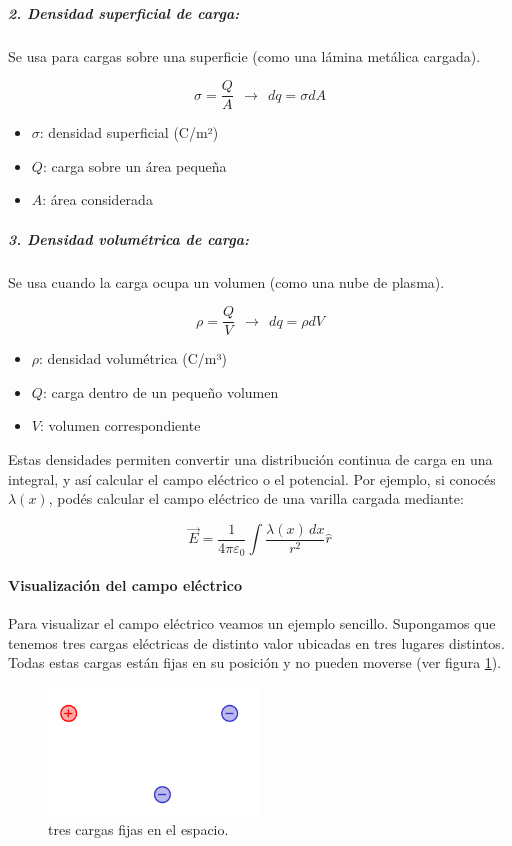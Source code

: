 \subparagraph{2. Densidad superficial de carga:}

Se usa para cargas sobre una superficie (como una lámina metálica cargada).

\[
\sigma = \frac{Q}{A} ~ ~ \rightarrow ~ ~ dq = \sigma dA
\]

\begin{itemize}
    \item \( \sigma \): densidad superficial (C/m²)  
    \item \( Q \): carga sobre un área pequeña  
    \item \( A \): área considerada  
\end{itemize}

\subparagraph{3. Densidad volumétrica de carga:}

Se usa cuando la carga ocupa un volumen (como una nube de plasma).

\[
\rho = \frac{Q}{V} ~ ~ \rightarrow ~ ~ dq = \rho dV
\]

\begin{itemize}
    \item \( \rho \): densidad volumétrica (C/m³)  
    \item \( Q \): carga dentro de un pequeño volumen  
    \item \( V \): volumen correspondiente  
\end{itemize}


Estas densidades permiten convertir una distribución continua de carga en una integral, y así calcular el campo eléctrico o el potencial.  
Por ejemplo, si conocés \( \lambda(x) \), podés calcular el campo eléctrico de una varilla cargada mediante:

\[
\vec{E} = \frac{1}{4\pi\varepsilon_0} \int \frac{\lambda(x)\, dx}{r^2} \hat{r}
\]

\paragraph{Visualización del campo eléctrico}

Para visualizar el campo eléctrico veamos un ejemplo sencillo. Supongamos que tenemos tres cargas eléctricas de distinto valor ubicadas en tres lugares distintos. Todas estas cargas están fijas en su posición y no pueden moverse (ver figura \ref{fig:campo_electrico_ejemplo_1}). 

\begin{figure}[ht]
    \centering
    \includegraphics[width=0.5\textwidth]{images/field_ex_1.png}
    \caption{tres cargas fijas en el espacio.}
    \label{fig:campo_electrico_ejemplo_1}
\end{figure}

